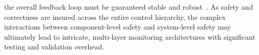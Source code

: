 the overall feedback loop must be guaranteed stable and robust~\cite{Ioannou96,Ioannou94,Kanaris01}. As safety and correctness  are insured across the entire control hierarchy, the complex interactions between component-level safety and system-level safety  may ultimately lead to intricate, multi-layer monitoring architectures with significant testing and validation overhead.   







